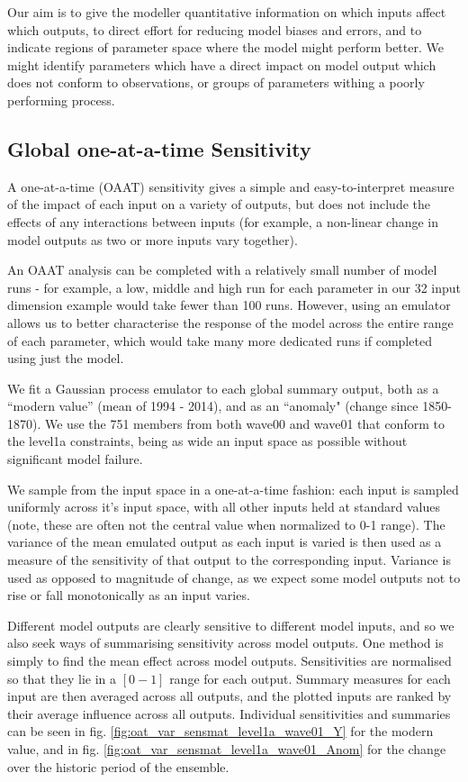 \documentclass[gmd, manuscript]{copernicus}
\begin{document}
Our aim is to give the modeller quantitative information on which inputs affect which outputs, to direct effort for reducing model biases and errors, and to indicate regions of parameter space where the model might perform better. We might identify parameters which have a direct impact on model output which does not conform to observations, or groups of parameters withing a poorly performing process.

\subsection{Global one-at-a-time Sensitivity}\label{ssec:sa_oaat}

A one-at-a-time (OAAT) sensitivity gives a simple and easy-to-interpret measure of the impact of each input on a variety of outputs, but does not include the effects of any interactions between inputs (for example, a non-linear change in model outputs as two or more inputs vary together).  

An OAAT analysis can be completed with a relatively small number of model runs - for example, a low, middle and high run for each parameter in our 32 input dimension example would take fewer than 100 runs. However, using an emulator allows us to better characterise the response of the model across the entire range of each parameter, which would take many more dedicated runs if completed using just the model.

We fit a Gaussian process emulator to each global summary output, both as a ``modern value'' (mean of 1994 - 2014), and as an ``anomaly" (change since 1850-1870). We use the 751 members from both wave00 and wave01 that conform to the level1a constraints, being as wide an input space as possible without significant model failure.

We sample from the input space in a one-at-a-time fashion: each input is sampled uniformly across it's input space, with all other inputs held at standard values (note, these are often not the central value when normalized to 0-1 range). The variance of the mean emulated output as each input is varied is then used as a measure of the sensitivity of that output to the corresponding input. Variance is used as opposed to magnitude of change, as we expect some model outputs not to rise or fall monotonically as an input varies.

Different model outputs are clearly sensitive to different model inputs, and so we also seek ways of summarising sensitivity across model outputs. One method is simply to find the mean effect across model outputs. Sensitivities are normalised so that they lie in a $[0 -1]$ range for each output. Summary measures for each input are then averaged across all outputs, and the plotted inputs are ranked by their average influence across all outputs. Individual sensitivities and summaries can be seen in fig. \ref{fig:oat_var_sensmat_level1a_wave01_Y} for the modern value, and in fig. \ref{fig:oat_var_sensmat_level1a_wave01_Anom} for the change over the historic period of the ensemble. 
\end{document}
